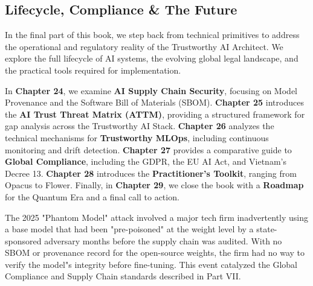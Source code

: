 % 
%

\begin{partbacktext}
\part{Lifecycle, Compliance \& The Future}
\noindent In the final part of this book, we step back from technical primitives to address the operational and regulatory reality of the Trustworthy AI Architect. We explore the full lifecycle of AI systems, the evolving global legal landscape, and the practical tools required for implementation.

In \textbf{Chapter 24}, we examine \textbf{AI Supply Chain Security}, focusing on Model Provenance and the Software Bill of Materials (SBOM). \textbf{Chapter 25} introduces the \textbf{AI Trust Threat Matrix (ATTM)}, providing a structured framework for gap analysis across the Trustworthy AI Stack. \textbf{Chapter 26} analyzes the technical mechanisms for \textbf{Trustworthy MLOps}, including continuous monitoring and drift detection. \textbf{Chapter 27} provides a comparative guide to \textbf{Global Compliance}, including the GDPR, the EU AI Act, and Vietnam's Decree 13. \textbf{Chapter 28} introduces the \textbf{Practitioner's Toolkit}, ranging from Opacus to Flower. Finally, in \textbf{Chapter 29}, we close the book with a \textbf{Roadmap} for the Quantum Era and a final call to action.

\begin{casestudy} 
The 2025 "Phantom Model" attack involved a major tech firm inadvertently using a base model that had been "pre-poisoned" at the weight level by a state-sponsored adversary months before the supply chain was audited. With no SBOM or provenance record for the open-source weights, the firm had no way to verify the model"s integrity before fine-tuning. This event catalyzed the Global Compliance and Supply Chain standards described in Part VII. 
\end{casestudy} 
\end{partbacktext}
